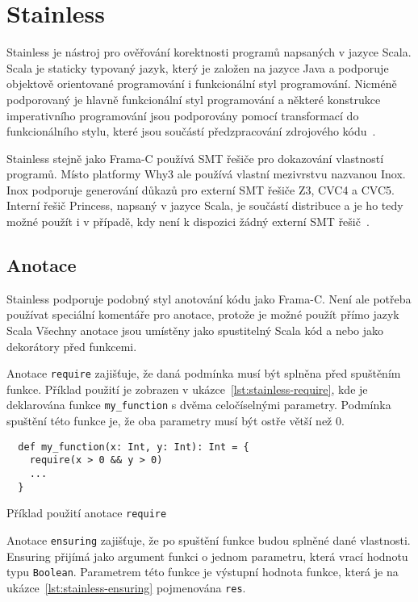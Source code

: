 \chapter{Stainless}
\label{ch:stainless}

Stainless je nástroj pro ověřování korektnosti programů napsaných v jazyce Scala.
Scala je staticky typovaný jazyk, který je založen na jazyce Java
a podporuje objektově orientované programování i funkcionální styl programování.
Nicméně podporovaný je hlavně funkcionální styl programování a některé konstrukce
imperativního programování jsou podporovány pomocí transformací do funkcionálního stylu,
které jsou součástí předzpracování zdrojového kódu~\cite{StainlessDocs}.

Stainless stejně jako Frama\mbox{-}C používá SMT řešiče pro dokazování vlastností programů.
Místo platformy Why3 ale používá vlastní mezivrstvu nazvanou Inox.
Inox podporuje generování důkazů pro externí SMT řešiče Z3, CVC4 a CVC5.
Interní řešič Princess, napsaný v jazyce Scala, je součástí distribuce a je ho tedy možné použít
i v případě, kdy není k dispozici žádný externí SMT řešič~\cite{InoxSolver}.

\section{Anotace}
\label{sec:stainless-annotations}

Stainless podporuje podobný styl anotování kódu jako Frama\mbox{-}C\@.
Není ale potřeba používat speciální komentáře pro anotace,
protože je možné použít přímo jazyk Scala
Všechny anotace jsou umístěny jako spustitelný Scala kód a nebo jako dekorátory před funkcemi.

Anotace \texttt{require} zajišťuje, že daná podmínka musí být splněna před spuštěním funkce.
Příklad použití je zobrazen v ukázce~\ref{lst:stainless-require},
kde je deklarována funkce \texttt{my\_function} s dvěma celočíselnými parametry.
Podmínka spuštění této funkce je, že oba parametry musí být ostře větší než 0.

\begin{listing}[H]
  \begin{verbatim}
  def my_function(x: Int, y: Int): Int = {
    require(x > 0 && y > 0)
    ...
  }
  \end{verbatim}
  \caption{Příklad použití anotace \texttt{require}}
  \label{lst:stainless-require}
\end{listing}

Anotace \texttt{ensuring} zajišťuje, že po spuštění funkce budou splněné dané vlastnosti.
Ensuring přijímá jako argument funkci o jednom parametru,
která vrací hodnotu typu \texttt{Boolean}.
Parametrem této funkce je výstupní hodnota funkce,
která je na ukázce~\ref{lst:stainless-ensuring} pojmenována \texttt{res}.

